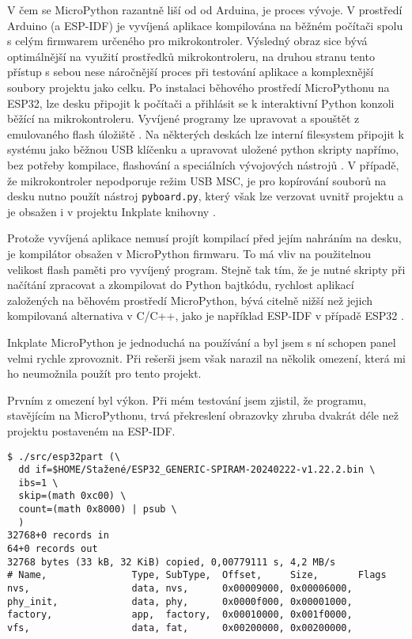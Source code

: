 V čem se MicroPython razantně liší od od Arduina, je proces vývoje. V prostředí Arduino (a ESP-IDF) je vyvíjená aplikace kompilována na běžném počítači spolu s celým firmwarem určeného pro mikrokontroler. Výsledný obraz sice bývá optimálnější na využití prostředků mikrokontroleru, na druhou stranu tento přístup s sebou nese náročnější proces při testování aplikace a komplexnější soubory projektu jako celku. Po instalaci běhového prostředí MicroPythonu na ESP32, lze desku připojit k počítači a přihlásit se k interaktivní Python konzoli běžící na mikrokontroleru. Vyvíjené programy lze upravovat a spouštět z emulovaného flash úložiště \cite{MicroPythonPythonMicrocontrollers}. Na některých deskách lze interní filesystem připojit k systému jako běžnou USB klíčenku a upravovat uložené python skripty napřímo, bez potřeby kompilace, flashování a speciálních vývojových nástrojů \cite{WorkingFilesystemsMicroPython}. V případě, že mikrokontroler nepodporuje režim USB MSC, je pro kopírování souborů na desku nutno použít nástroj \lstinline|pyboard.py|, který však lze verzovat uvnitř projektu a je obsažen i v projektu Inkplate knihovny \cite{PyboardPyTool}.

Protože vyvíjená aplikace nemusí projít kompilací před jejím nahráním na desku, je kompilátor obsažen v MicroPython firmwaru. To má vliv na použitelnou velikost flash paměti pro vyvíjený program. Stejně tak tím, že je nutné skripty při načítání zpracovat a zkompilovat do Python bajtkódu, rychlost aplikací založených na běhovém prostředí MicroPython, bývá citelně nižší než jejich kompilovaná alternativa v C/C++, jako je například ESP-IDF v případě ESP32 \cite{plauskaPerformanceEvaluationMicroPython2022}.

Inkplate MicroPython je jednoduchá na používání a byl jsem s ní schopen panel velmi rychle zprovoznit. Při rešerši jsem však narazil na několik omezení, která mi ho neumožnila použít pro tento projekt.

Prvním z omezení byl výkon. Při mém testování jsem zjistil, že programu, stavějícím na MicroPythonu, trvá překreslení obrazovky zhruba dvakrát déle než projektu postaveném na ESP-IDF. 

\begin{lstlisting}[label=src:micropython-spiram-partition-table,caption={Tabulka oddílů vyčtena z MicroPython firmwaru pomocí nástroje esp32part}]
$ ./src/esp32part (\
  dd if=$HOME/Stažené/ESP32_GENERIC-SPIRAM-20240222-v1.22.2.bin \
  ibs=1 \
  skip=(math 0xc00) \
  count=(math 0x8000) | psub \
  )
32768+0 records in
64+0 records out
32768 bytes (33 kB, 32 KiB) copied, 0,00779111 s, 4,2 MB/s
# Name,               Type, SubType,  Offset,     Size,       Flags
nvs,                  data, nvs,      0x00009000, 0x00006000, 
phy_init,             data, phy,      0x0000f000, 0x00001000, 
factory,              app,  factory,  0x00010000, 0x001f0000, 
vfs,                  data, fat,      0x00200000, 0x00200000,
\end{lstlisting}

